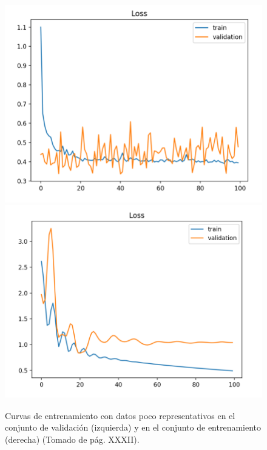 \begin{figure}[h!]
	\begin{center}
		\includegraphics[scale=.2]{Graphics/unrepresentative_dev_set.png}
		\includegraphics[scale=.2]{Graphics/unrepresentative_train_set.png}
		\caption{Curvas de entrenamiento con datos poco representativos en el conjunto de validación (izquierda) 
		y en el conjunto de entrenamiento (derecha) (Tomado de \textcite{brownlee2018better} pág. XXXII).}\label{fig:unrepresentative_data}
	\end{center}
\end{figure}

